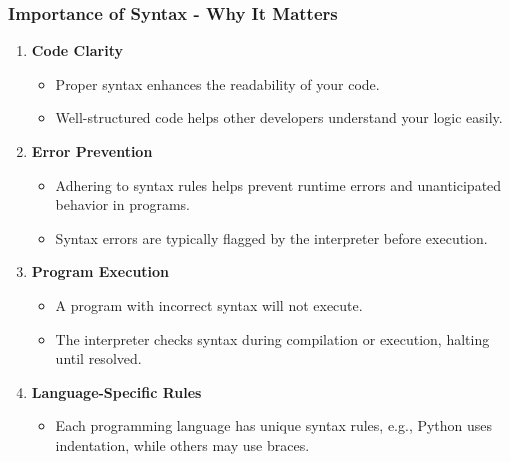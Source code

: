 \documentclass{beamer}
\begin{document}
\begin{frame}[fragile]
    \frametitle{Importance of Syntax - Why It Matters}
    \begin{enumerate}
        \item \textbf{Code Clarity}
        \begin{itemize}
            \item Proper syntax enhances the readability of your code.
            \item Well-structured code helps other developers understand your logic easily.
        \end{itemize}
        
        \item \textbf{Error Prevention}
        \begin{itemize}
            \item Adhering to syntax rules helps prevent runtime errors and unanticipated behavior in programs.
            \item Syntax errors are typically flagged by the interpreter before execution.
        \end{itemize}
        
        \item \textbf{Program Execution}
        \begin{itemize}
            \item A program with incorrect syntax will not execute.
            \item The interpreter checks syntax during compilation or execution, halting until resolved.
        \end{itemize}
        
        \item \textbf{Language-Specific Rules}
        \begin{itemize}
            \item Each programming language has unique syntax rules, e.g., Python uses indentation, while others may use braces.
        \end{itemize}
    \end{enumerate}
\end{frame}
\end{document}
